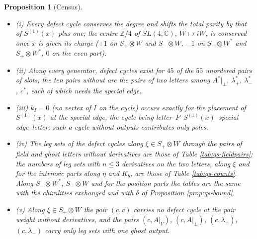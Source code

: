 \documentclass[11pt]{article}
\numberwithin{equation}{section}
\theoremstyle{plain}
\newtheorem{proposition}[theorem]{Proposition}
\theoremstyle{definition}
\newcommand{\Ap}{A|_{\perp}}
\newcommand{\AV}{A|_V}
\begin{document}
\begin{proposition}[Census]
\label{prop:qs-census}
\begin{itemize}
\item (i) Every defect cycle conserves the degree and shifts the total parity by that of $S^{(1)}(x)$ plus one; the centre $\mathbb Z/4$ of $SL(4,\mathbb C)$, $W\mapsto iW$, is conserved once $x$ is given its charge ($+1$ on $S_+\otimes W$ and $S_-\otimes W$, $-1$ on $S_-\otimes W^*$ and $S_+\otimes W^*$, $0$ on the even part).
\item (ii) Along every generator, defect cycles exist for $45$ of the $55$ unordered pairs of slots; the ten pairs without are the pairs of two letters among $A^*|_\perp$, $\lambda^*_+$, $\lambda^*_-$, $c^*$, each of which needs the special edge.
\item (iii) $k_I=0$ (no vertex of $I$ on the cycle) occurs exactly for the placement of $S^{(1)}(x)$ at the special edge, the cycle being letter--$P$--$S^{(1)}(x)$--special edge--letter; such a cycle without outputs contributes only poles.
\item (iv) The leg sets of the defect cycles along $\xi\in S_+\otimes W$ through the pairs of field and ghost letters without derivatives are those of Table \ref{tab:qs-fieldpairs}; the numbers of leg sets with $n\le3$ derivatives on the two letters, along $\xi$ and for the intrinsic parts along $\eta$ and $K_b$, are those of Table \ref{tab:qs-counts}. Along $S_-\otimes W^*$, $S_-\otimes W$ and for the position parts the tables are the same with the chiralities exchanged and with $\delta$ of Proposition \ref{prop:qs-bound}.
\item (v) Along $\xi\in S_+\otimes W$ the pair $(c,c)$ carries no defect cycle at the pair weight without derivatives, and the pairs $(c,\AV)$, $(c,\Ap)$, $(c,\lambda_+)$, $(c,\lambda_-)$ carry only leg sets with one ghost output.
\end{itemize}
\end{proposition}
\end{document}
